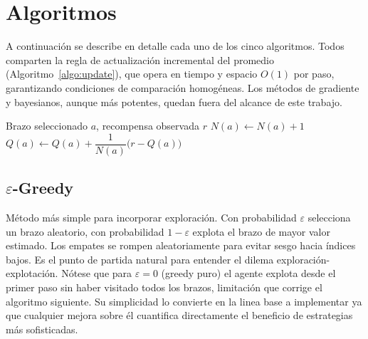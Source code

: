



\section{Algoritmos}

A continuación se describe en detalle cada uno de los cinco algoritmos. Todos comparten la regla de actualización incremental del promedio (Algoritmo~\ref{algo:update}), que opera en tiempo y espacio $O(1)$ por paso, garantizando condiciones de comparación homogéneas. Los métodos de gradiente y bayesianos, aunque más potentes, quedan fuera del alcance de este trabajo.

\begin{algorithm}
\caption{Actualización incremental del valor estimado}\label{algo:update}
\begin{algorithmic}[1]
\Require Brazo seleccionado $a$, recompensa observada $r$
\State $N(a) \gets N(a) + 1$
\State $Q(a) \gets Q(a) + \dfrac{1}{N(a)}\bigl(r - Q(a)\bigr)$
\end{algorithmic}
\end{algorithm}

\subsection*{$\varepsilon$-Greedy}

Método más simple para incorporar exploración. Con probabilidad $\varepsilon$ selecciona un brazo aleatorio, con probabilidad $1-\varepsilon$ explota el brazo de mayor valor estimado. Los empates se rompen aleatoriamente para evitar sesgo hacia índices bajos. Es el punto de partida natural para entender el dilema exploración-explotación. Nótese que para $\varepsilon=0$ (greedy puro) el agente explota desde el primer paso sin haber visitado todos los brazos, limitación que corrige el algoritmo siguiente. Su simplicidad lo convierte en la linea base a implementar ya que cualquier mejora sobre él cuantifica directamente el beneficio de estrategias más sofisticadas.

